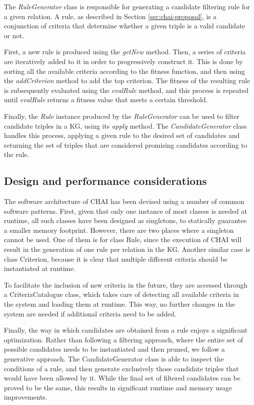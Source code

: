 The \textit{RuleGenerator} class is responsible for generating a candidate filtering rule for a given relation. A rule, as described in Section \ref{sec:chai-proposal}, is a conjunction of criteria that determine whether a given triple is a valid candidate or not. 

First, a new rule is produced using the \textit{getNew} method. Then, a series of criteria are iteratively added to it in order to progressively construct it. This is done by sorting all the available criteria according to the fitness function, and then using the \textit{addCriterion} method to add the top criterion. The fitness of the resulting rule is subsequently evaluated using the \textit{evalRule} method, and this process is repeated until \textit{evalRule} returns a fitness value that meets a certain threshold.

Finally, the \textit{Rule} instance produced by the \textit{RuleGenerator} can be used to filter candidate triples in a KG, using its \textit{apply} method. The \textit{CandidateGenerator} class handles this process, applying a given rule to the desired set of candidates and returning the set of triples that are considered promising candidates according to the rule.

\subsection{Design and performance considerations}
The software architecture of CHAI has been devised using a number of common software patterns. First, given that only one instance of most classes is needed at runtime, all such classes have been designed as singletons, to statically guarantee a smaller memory footprint. 
However, there are two places where a singleton cannot be used. One of them is for class Rule, since the execution of CHAI will result in the generation of one rule per relation in the KG. Another similar case is class Criterion, because it is clear that multiple different criteria should be instantiated at runtime.

To facilitate the inclusion of new criteria in the future, they are accessed through a CriteriaCatalogue class, which takes care of detecting all available criteria in the system and loading them at runtime. This way, no further changes in the system are needed if additional criteria need to be added.

Finally, the way in which candidates are obtained from a rule enjoys a significant optimization. Rather than following a filtering approach, where the entire set of possible candidates needs to be instantiated and then pruned, we follow a generative approach. The CandidateGenerator class is able to inspect the conditions of a rule, and then generate exclusively those candidate triples that would have been allowed by it. While the final set of filtered candidates can be proved to be the same, this results in significant runtime and memory usage improvements.

